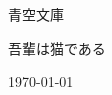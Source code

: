 \begin{titlepage}
    \begin{center}
        \Large {青空文庫} \par
        \vspace{15mm}
        \huge{吾輩は猫である} \par
        \vspace{170mm}
        \Large \today \par
    \end{center}
\end{titlepage}